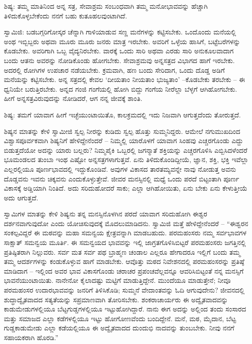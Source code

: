 ಶಿಷ್ಯ: ತಮ್ಮ ಮಾತಿನಿಂದ ಅನ್ನ ಸತ್ರ, ಸೇವಾಶ್ರಮ ಸಂಬಂಧವಾಗಿ ತಮ್ಮ ಮನೋಭಾವವನ್ನು ಹೆಚ್ಚಾಗಿ ತಿಳಿದುಕೊಳ್ಳಬೇಕೆಂದು ನನಗೆ ಬಹು ಕುತೂಹಲವುಂಟಾಗಿದೆ.

ಸ್ವಾಮಿಜಿ: ಬಡಬಗ್ಗರಿಗೋಸ್ಕರ ಚೆನ್ನಾಗಿ ಗಾಳಿಯಾಡುವ ಸಣ್ಣ ಮನೆಗಳನ್ನು ಕಟ್ಟಿಸಬೇಕು. ಒಂದೊಂದು ಮನೆಯಲ್ಲಿ ಅಂಥ ಇಬ್ಬಿಬ್ಬರು ಅಥವಾ ಮೂರು ಮೂರು ಜನರು ಮಾತ್ರ ಇರಬೇಕು. ಅವರಿಗೆ ಒಳ್ಳೆಯ ಹಾಸಿಗೆ, ಬಟ್ಟೆಬರೆಗಳನ್ನು ಕೊಡಬೇಕು. ಅವರಿಗಾಗಿ ಒಬ್ಬ ವೈದ್ಯನಿರಬೇಕು. ವಾರಕ್ಕೆ ಒಂದು ಸಾರಿ ಅಥವಾ ಎರಡು ಸಾರಿ ಅನುಕೂಲವಾದಾಗ ಬಂದು ಆತನು ಅವರನ್ನು ನೋಡಿಕೊಂಡು ಹೋಗಬೇಕು. ಸೇವಾಶ್ರಮವು ಅನ್ನಸತ್ರದ ವಿಭಾಗದ ಹಾಗೆ ಇರಬೇಕು. ಅದರಲ್ಲಿ ರೋಗಿಗಳ ಉಪಚಾರ ನಡೆಯಬೇಕು. ಕ್ರಮವಾಗಿ, ಹಣ ಬಂದು ಸೇರಿದಾಗ, ಒಂದು ದೊಡ್ಡ ಅಡಿಗೆ ಮನೆಯನ್ನು ಕಟ್ಟಿಸಬೇಕು. ಅನ್ನ ಸತ್ರದಲ್ಲಿ ಕೇವಲ ‘ದೀಯತಾಂ ನೀಯತಾಂ ಭುಜ್ಯತಾಂ’ –ಕೊಡಬೇಕು ತರಬೇಕು – ಈ ಧ್ವನಿಯೇ ಬರುತ್ತಿರಬೇಕು. ಅನ್ನದ ಗಂಜಿ ಗಂಗೆಯಲ್ಲಿ ಹೋಗಿ ಬಿದ್ದು ಗಂಗೆಯ ನೀರೆಲ್ಲಾ ಬೆಳ್ಳಗೆ ಆಗಿಹೋಗಬೇಕು. ಹೀಗೆ ಅನ್ನಸತ್ರವಿರುವುದನ್ನು ನೋಡಿದರೆ, ಆಗ ನನ್ನ ಜೀವಕ್ಕೆ ಶಾಂತಿ.

ಶಿಷ್ಯ: ತಮಗೆ ಯಾವಾಗ ಹೀಗೆ ಇಚ್ಛೆಯುಂಟಾಯಿತೊ, ಕಾಲಕ್ರಮದಲ್ಲಿ ಇದು ನಿಜವಾಗಿ ಆಗುತ್ತದೆಂದು ತೋರುತ್ತದೆ.

ಶಿಷ್ಯನ ಮಾತನ್ನು ಕೇಳಿ ಸ್ವಾಮೀಜಿ ಸ್ವಲ್ಪ ನೀರನ್ನು ಕುಡಿದು ಸ್ವಲ್ಪ ಹೊತ್ತು ಸುಮ್ಮನಿದ್ದರು. ಆಮೇಲೆ ನಗುಮುಖದಿಂದ ವಿಶ್ವಾಸಪೂರ್ವಕವಾಗಿ ಶಿಷ್ಯನಿಗೆ ಹೇಳಿದ್ದೇನೆಂದರೆ – ನಿಮ್ಮಲ್ಲಿ ಯಾರೊಳಗೆ ಯಾವಾಗ ಸಿಂಹವು ಎಚ್ಚರಗೊಂಡು ಎದ್ದು ಬಿಡುತ್ತದೆಯೋ ಅದನ್ನು ಯಾರು ಬಲ್ಲರು? ನಿಮ್ಮಪೈಕಿ ಒಬ್ಬರಲ್ಲಿ ಜಗನ್ಮಾತೆ ಶಕ್ತಿಯನ್ನು ಎಚ್ಚರಗೊಳಿಸಿ ಎಬ್ಬಿಸಿದಳೆಂದರೆ ಭೂಮಂಡಲದ ತುಂಬಾ ಇಂಥ ಎಷ್ಟೋ ಅನ್ನಸತ್ರಗಳಾಗುತ್ತವೆ. ಏನು ತಿಳಿದುಕೊಂಡಿದ್ದೀಯೆ, ಜ್ಞಾನ, ಶಕ್ತಿ, ಭಕ್ತಿ ಇವೆಲ್ಲಾ ಎಲ್ಲರಲ್ಲಿಯೂ ಪೂರ್ಣಭಾವದಲ್ಲಿ ಇದ್ದುಕೊಂಡಿವೆ. ಅವುಗಳ ವಿಕಾಸದ ತಾರತಮ್ಯವನ್ನೇ ನಾವು ನೋಡುತ್ತ ಅವನು ದೊಡ್ಡವನು ಇವನು ಚಿಕ್ಕವನು ಎಂದುಕೊಳ್ಳುತ್ತೇವೆ. ಜೀವರ ಮನಸ್ಸಿನಲ್ಲಿ ಮಧ್ಯೆ ಒಂದು ಪರದೆ ಬಿಟ್ಟಂತಾಗಿ ಪೂರ್ಣ ವಿಕಾಸಕ್ಕೆ ಅಡ್ಡಿಯಾಗಿ ನಿಂತಿದೆ. ಅದು ಸರಿದುಹೋದರೆ ಸಾಕು; ಎಲ್ಲಾ ಆಗಿಹೋಯಿತು, ಏನು ಬೇಕು ಏನು ಕೇಳುತ್ತೀಯೆ ಅದು ಆಗುತ್ತದೆ.

ಸ್ವಾಮಿಗಳ ಮಾತನ್ನು ಕೇಳಿ ಶಿಷ್ಯನು ತನ್ನ ಮನಸ್ಸಿನೊಳಗಿನ ಪರದೆ ಯಾವಾಗ ಸರಿದುಹೋಗಿ ಈಶ್ವರ ದರ್ಶನವಾಗುವುದೋ ಎಂದು ಯೋಚಿಸುವುದಕ್ಕೆ ಮೊದಲುಮಾಡಿದನು. ಸ್ವಾಮಿಜಿ ಮತ್ತೆ ಹೇಳಿದ್ದೇನೆಂದರೆ – “ಈಶ್ವರನ ಸಂಕಲ್ಪವಿದ್ದರೆ ಈ ಮಠವನ್ನು ಮಹಾ ಸಮನ್ವಯ ಕ್ಷೇತ್ರವನ್ನಾಗಿ ಮಾಡಬಹುದು. ಪರಮಹಂಸರು ನಮ್ಮ ಸರ್ವಭಾವಗಳ ಸಾಕ್ಷಾತ್ ಸಮನ್ವಯ ಮೂರ್ತಿ. ಈ ಸಮನ್ವಯದ ಭಾವವನ್ನು ಇಲ್ಲಿ ಜಾಗ್ರತಗೊಳಿಸಿಬಿಟ್ಟರೆ ಪರಮಹಂಸರು ಜಗತ್ತಿನಲ್ಲಿ ಪ್ರತಿಷ್ಠಿತರಾಗಿ ನಿಲ್ಲುವರು. ಸರ್ವ ಮತ ಸರ್ವ ಪಥ ಬ್ರಾಹ್ಮಣ ಚಂಡಾಲ ಎಲ್ಲರೂ ಹೇಗಾದರೂ ಇಲ್ಲಿಗೆ ಬಂದು ತಮ್ಮ ತಮ್ಮ ಆದರ್ಶಗಳನ್ನು ಕಂಡುಕೊಳ್ಳುವ ಹಾಗೆ ಮಾಡಬೇಕು. ಆವೊತ್ತು ಮಠದ ನಿವೇಶನದಲ್ಲಿ ಪರಮಹಂಸರನ್ನು ಪ್ರತಿಷ್ಠೆ ಮಾಡಿದಾಗ – ಇಲ್ಲಿಂದ ಅವರ ಭಾವ ವಿಕಾಸಗೊಂಡು ಚರಾಚರ ಪ್ರಪಂಚವೆಲ್ಲವನ್ನೂ ಆವರಿಸಿಬಿಟ್ಟಂತೆ ನನ್ನ ಮನಸ್ಸಿಗೆ ಭಾವನೆಯುಂಟಾಯಿತು. ನಾನೇನೋ ಕೈಲಾದಷ್ಟು ಮಟ್ಟಿಗೆ ಮಾಡುತ್ತಿದ್ದೇನೆ. ಮುಂದೆಯೂ ಮಾಡುತ್ತೇನೆ; ನೀವೂ ಪರಮಹಂಸರ ಉದಾರಭಾವವನ್ನು ಜನರಿಗೆ ತಿಳಿಸಿಕೊಡಿ; ಸುಮ್ಮನೆ ವೇದಾಂತವನ್ನು ಓದಿ ಆಗುವುದೇನು? ಜೀವನದಲ್ಲಿ ಶುದ್ಧಾದ್ವೈತವಾದದ ಸತ್ಯತೆಯನ್ನು ಸಪ್ರಮಾಣವಾಗಿ ತೋರಿಸಬೇಕು. ಶಂಕರಾಚಾರ್ಯರು ಈ ಅದ್ವೈತವಾದವನ್ನು ಕಾಡುಮೇಡುಗಳಲ್ಲಿಯೂ ಬೆಟ್ಟಗುಡ್ಡಗಳಲ್ಲಿಯೂ ಇಟ್ಟುಹೋಗಿದ್ದಾರೆ. ನಾನು ಈಗ ಅದನ್ನು ಅಲ್ಲಿಂದ ತಂದು ಸಂಸಾರದ ಮತ್ತು ಸಮಾಜದ ಎಲ್ಲಾ ಕಡೆಗಳಲ್ಲಿಯೂ ಇಟ್ಟು ಹೋಗೋಣವೆಂದು ಬಂದಿದ್ದೇನೆ. ಮನೆ, ಮಠ, ಮೈದಾನ, ಬೆಟ್ಟ ಗುಡ್ಡಕಾಡುಮೇಡು ಎಲ್ಲಾ ಕಡೆಯಲ್ಲಿಯೂ ಈ ಅದ್ವೈತವಾದದ ದುಂದುಭಿ ನಾದವನ್ನು ತುಂಬಬೇಕು. ನೀವು ನನಗೆ ಸಹಾಯಕರಾಗಿ ಹೊರಡಿ.”

